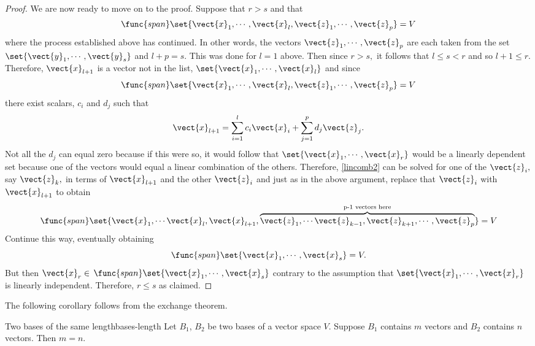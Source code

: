 \begin{proof}
We are now ready to move on to the proof. Suppose that $r>s$ and that 
\[
\func{span}\set{\vect{x}_{1},\cdots ,
\vect{x}_{l},\vect{z}_{1},\cdots ,\vect{z}_{p}} =V
\]
 where the process established above has continued. In other words, the vectors $\vect{z}_{1},\cdots ,\vect{z}_{p}$ are each taken from the
set $\set{\vect{y}_{1},\cdots ,\vect{y}_{s}} $ and $l+p=s.$
This was done for $l=1$ above. Then since $r>s,$ it follows that $
l\leq s<r$ and so $l+1\leq r.$ Therefore, $\vect{x}_{l+1}$ is a vector not
in the list, $\set{\vect{x}_{1},\cdots ,\vect{x}_{l}} $ and
since 
\[
\func{span}\set{\vect{x}_{1},\cdots ,\vect{x}_{l},\vect{z}
_{1},\cdots ,\vect{z}_{p}} =V
\]
 there exist scalars, $c_{i}$ and $
d_{j}$ such that 
\begin{equation}
\vect{x}_{l+1}=\sum_{i=1}^{l}c_{i}\vect{x}_{i}+\sum_{j=1}^{p}d_{j}
\vect{z}_{j}.  \label{lincomb2}
\end{equation}
Not all the $d_{j}$ can equal zero because if this were so, it would follow
that $\set{\vect{x}_{1},\cdots ,\vect{x}_{r}} $ would be a
linearly dependent set because one of the vectors would equal a linear
combination of the others. Therefore, \ref{lincomb2} can be solved for one of the 
$\vect{z}_{i},$ say $\vect{z}_{k},$ in terms of $\vect{x}_{l+1}$ and
the other $\vect{z}_{i}$ and just as in the above argument, replace that $
\vect{z}_{i}$ with $\vect{x}_{l+1}$ to obtain 
\begin{equation*}
\func{span}\set{\vect{x}_{1},\cdots \vect{x}_{l},\vect{x}_{l+1},
\overset{\text{p-1 vectors here}}{\overbrace{\vect{z}_{1},\cdots \vect{z}
_{k-1},\vect{z}_{k+1},\cdots ,\vect{z}_{p}}}} =V
\end{equation*}
Continue this way, eventually obtaining 
\begin{equation*}
\func{span}\set{\vect{x}_{1},\cdots ,\vect{x}_{s}} =V.
\end{equation*}
But then $\vect{x}_{r}\in $ $\func{span}\set{\vect{x}_{1},\cdots ,
\vect{x}_{s}} $ contrary to the assumption that $\set{\vect{x}
_{1},\cdots ,\vect{x}_{r}} $ is linearly independent. Therefore, $
r\leq s$ as claimed.
\end{proof}

The following corollary follows from the exchange theorem.

\begin{corollary}{Two bases of the same length}{bases-length}
Let $B_1$, $B_2$ be two bases of a vector space $V$. Suppose $B_1$ contains $m$ vectors and $B_2$ contains $n$ vectors. Then $m = n$.
\end{corollary}

